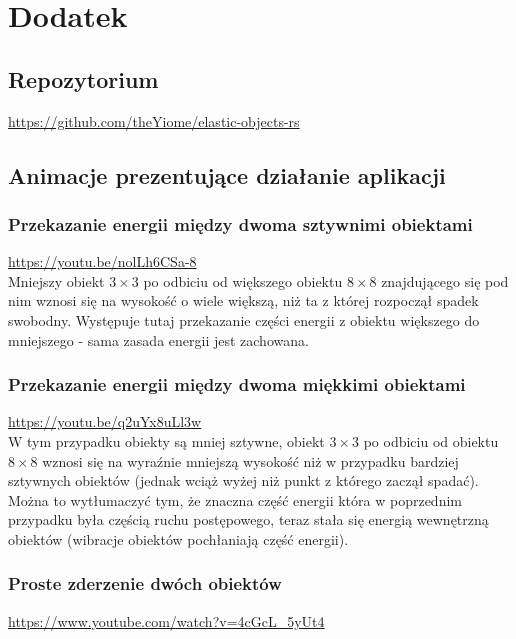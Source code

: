 \documentclass[12pt, letterpaper]{report}
\begin{document}
    \clearpage
    \section{Dodatek}

    \subsection{Repozytorium}
    \url{https://github.com/theYiome/elastic-objects-rs}

    \subsection{Animacje prezentujące działanie aplikacji}
    
    \subsubsection{Przekazanie energii między dwoma sztywnimi obiektami}
    \url{https://youtu.be/nolLh6CSa-8} \\

    Mniejszy obiekt $3 \times 3$ po odbiciu od większego obiektu $8 \times  8$ 
    znajdującego się  pod nim wznosi się na
    wysokość o wiele większą, niż ta z której rozpoczął spadek swobodny.
    Występuje tutaj przekazanie części energii z obiektu 
    większego do mniejszego - sama zasada energii jest zachowana.

    \subsubsection{Przekazanie energii między dwoma miękkimi obiektami}
    \url{https://youtu.be/q2uYx8uLl3w} \\

    W tym przypadku obiekty są mniej sztywne, obiekt $3 \times 3$ po odbiciu 
    od obiektu $8 \times  8$ wznosi się na wyraźnie mniejszą wysokość niż w przypadku bardziej sztywnych obiektów
    (jednak wciąż wyżej niż punkt z którego zaczął spadać). Można to wytłumaczyć tym,
    że znaczna część energii która w poprzednim przypadku była częścią ruchu postępowego,
    teraz stała się energią wewnętrzną obiektów (wibracje obiektów pochłaniają część energii).

    \subsubsection{Proste zderzenie dwóch obiektów}
    \url{https://www.youtube.com/watch?v=4cGcL_5yUt4} \\ 
\end{document}
